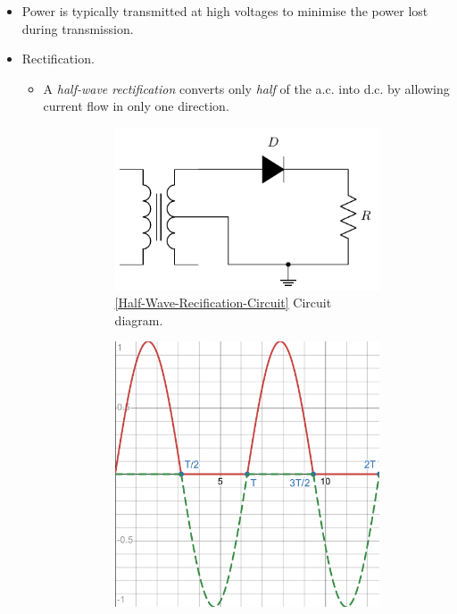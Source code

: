 \documentclass[oneside]{book}
\begin{document}
\begin{itemize}
\begin{enumerate}
    \end{enumerate}
    \item Power is typically transmitted at high voltages to minimise the power lost during transmission.
    \item Rectification.
    \begin{itemize}
        \item A \emph{half-wave rectification} converts only \emph{half} of the a.c. into d.c. by allowing current flow in only one direction.
        \begin{figure}[h]
            \centering
            \begin{subfigure}[c]{0.45\textwidth}
                \centering
                \includegraphics[width=0.7\linewidth]{../images/Half-Wave-Rectification/Half-Wave-Rectification.pdf}
                \caption{\ref{Half-Wave-Recification-Circuit} Circuit diagram.}
            \end{subfigure}%
            \begin{subfigure}[c]{0.45\textwidth}
                \centering
                \includegraphics[width=0.7\linewidth]{../images/Half-Wave-Rectification/Half-Wave-Rectification-Graph.pdf}

\end{subfigure}
\end{figure}
\end{itemize}
\end{itemize}
\end{document}
